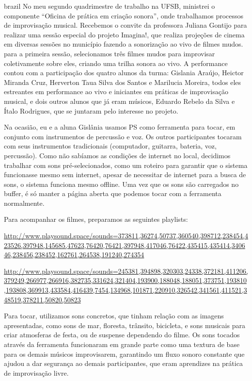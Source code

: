 \begin{otherlanguage*}{brazil}
No meu segundo quadrimestre de trabalho na UFSB, ministrei o componente ``Oficina de prática em criação sonora'', onde trabalhamos processos de improvisação musical. Recebemos o convite da professora Juliana Gontijo para realizar uma sessão especial do projeto Imagina!, que realiza projeções de cinema em diversas sessões no município fazendo a sonorização ao vivo de filmes mudos. para a primeira sessão, selecionamos três filmes mudos para improvisar coletivamente sobre eles, criando uma trilha sonora ao vivo. A performance contou com a participação dos quatro alunos da turma: Gislania Araújo, Heictor Miranda Cruz, Herverton Taua Silva dos Santos e Marilucia Moreira, todos eles estreantes em performance ao vivo e iniciantes em práticas de improvisação musical, e dois outros alunos que já eram músicos, Eduardo Rebelo da Silva e Ítalo Rodrigues, que se juntaram pelo interesse no projeto. 

Na ocasião, eu e a aluna Gislânia usamos PS como ferramenta para tocar, em conjunto com instrumentos de percussão e voz. Os outros participantes tocaram com seus instrumentos tradicionais (computador, guitarra, bateria, voz, percussão). Como não sabíamos as condições de internet no local, decidimos trabalhar com sons pré-selecionados, como um roteiro para garantir que o sistema funcionasse mesmo sem internet, apesar de necessitar de internet para a busca de sons, o sistema funciona mesmo offline. Uma vez que os sons são carregados no buffer, é só manter a página aberta que podemos tocar com a ferramenta normalmente.

Para acompanhar os filmes, preparamos as seguintes playlists: 

\url{http://www.playsound.space/sounds=373811,36274,50737,360540,398712,238454,423526,397948,145685,47623,76420,76421,397948,417046,76422,435415,435414,340646,238456,238452,162761,264538,191240,274354}

\url{http://www.playsound.space/sounds=245381,394898,320303,24338,372181,411206,379249,266977,266916,382735,331624,321404,193900,188048,188051,373751,193810,193808,369913,433584,416439,7454,134968,101871,220910,326542,341561,411521,348519,378211,50820,50823}

Para tocar, utilizamos sons concretos, que tinham relação com as imagens apresentadas, como sons de mar, floresta, trânsito, bicicleta, e sons musicais para criar atmosferas de festa, ou de suspense dependendo do filme. Os sons tocados através da ferramenta funcionaram em grande parte como uma textura de base para os demais músicos improvisarem, garantindo um fluxo sonoro constante que ajudou a dar segurança ao demais participantes, que eram aprendizes na prática de improvisação livre.





\end{otherlanguage*}
